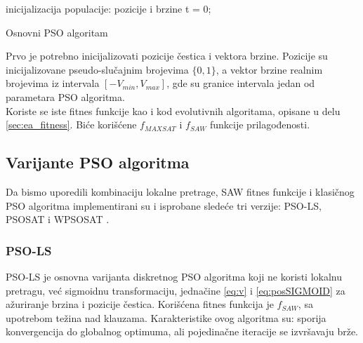 \documentclass[a4paper]{article}
\begin{document}
\begin{algorithm}[H]
\SetAlgoLined
{}

\BlankLine
 inicijalizacija populacije: pozicije i brzine\;
 t = 0; \\
\caption{Osnovni PSO algoritam}
\end{algorithm}


Prvo je potrebno inicijalizovati pozicije čestica i vektora brzine. 
Pozicije su inicijalizovane pseudo-slučajnim brojevima $\{0,1\}$, 
a vektor brzine realnim brojevima iz intervala $[-V_{min}, V_{max}]$, 
gde su granice intervala jedan od parametara PSO algoritma.\\

Koriste se iste fitnes funkcije kao i kod evolutivnih algoritama, opisane u delu
 \ref{sec:ea_fitness}. Biće korišćene $f_{MAXSAT}$ i $f_{SAW}$ funkcije prilagođenosti.\\

\subsection{Varijante PSO algoritma}
\label{sec:pso_varijante}
Da bismo uporedili kombinaciju lokalne pretrage, SAW fitnes funkcije i
klasičnog PSO algoritma implementirani su i isprobane sledeće tri verzije: 
PSO-LS, PSOSAT i WPSOSAT \cite{pso_layeb}.

\subsubsection{PSO-LS}
\label{sec:psols}
PSO-LS je osnovna varijanta diskretnog PSO algoritma koji ne koristi lokalnu pretragu, 
već sigmoidnu transformaciju, jednačine \ref{eq:v} i \ref{eq:posSIGMOID} 
za ažuriranje brzina i pozicije čestica. Korišćena fitnes funkcija je $f_{SAW}$, 
sa upotrebom težina nad klauzama. 
Karakteristike ovog algoritma su: sporija konvergencija do globalnog optimuma, 
ali pojedinačne iteracije se izvršavaju brže.
\end{document}
